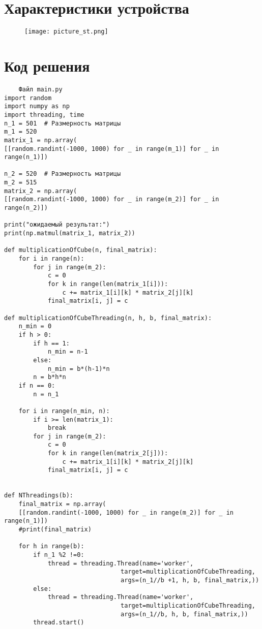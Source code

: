 \documentclass[a4paper, 14pt]{extarticle}
\begin{document}
\section{Характеристики устройства}\label{Sect::task}

\begin{figure}
    \centering
    \texttt{[image: picture\_st.png]}
    \label{fig:enter-label}
\end{figure}

\pagebreak
\section{Код решения}
\begin{verbatim}
    Файл main.py
import random
import numpy as np
import threading, time
n_1 = 501  # Размерность матрицы
m_1 = 520
matrix_1 = np.array(
[[random.randint(-1000, 1000) for _ in range(m_1)] for _ in range(n_1)])

n_2 = 520  # Размерность матрицы
m_2 = 515
matrix_2 = np.array(
[[random.randint(-1000, 1000) for _ in range(m_2)] for _ in range(n_2)])

print("ожидаемый результат:")
print(np.matmul(matrix_1, matrix_2))

def multiplicationOfCube(n, final_matrix):
    for i in range(n):
        for j in range(m_2):
            c = 0
            for k in range(len(matrix_1[i])):
                c += matrix_1[i][k] * matrix_2[j][k]
            final_matrix[i, j] = c
    
def multiplicationOfCubeThreading(n, h, b, final_matrix):
    n_min = 0
    if h > 0:
        if h == 1:
            n_min = n-1
        else:
            n_min = b*(h-1)*n
        n = b*h*n
    if n == 0:
        n = n_1

    for i in range(n_min, n):
        if i >= len(matrix_1):
            break
        for j in range(m_2):
            c = 0
            for k in range(len(matrix_2[j])):
                c += matrix_1[i][k] * matrix_2[j][k]
            final_matrix[i, j] = c


def NThreadings(b):
    final_matrix = np.array(
    [[random.randint(-1000, 1000) for _ in range(m_2)] for _ in range(n_1)])
    #print(final_matrix)

    for h in range(b):
        if n_1 %2 !=0:
            thread = threading.Thread(name='worker', 
                                target=multiplicationOfCubeThreading, 
                                args=(n_1//b +1, h, b, final_matrix,))
        else:
            thread = threading.Thread(name='worker', 
                                target=multiplicationOfCubeThreading, 
                                args=(n_1//b, h, b, final_matrix,))
        thread.start()
    

\end{verbatim}
\end{document}
